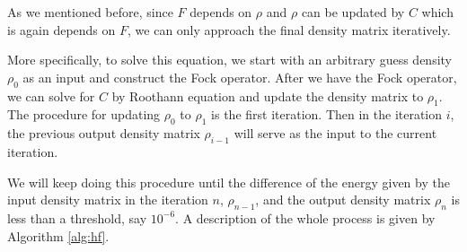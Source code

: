 \documentclass[twoside,11pt]{article}
\begin{document}



As we mentioned before, since $F$ depends on $\rho$ and $\rho$ can be updated by $C$ which is again depends on $F$, we can only approach the final density matrix iteratively.

More specifically, to solve this equation, we start with an arbitrary guess density $\rho_0$ as an input and construct the Fock operator. 
After we have the Fock operator, we can solve for $C$ by Roothann equation and update the density matrix to $\rho_1$. The procedure for updating $\rho_0$ to $\rho_1$ is the first iteration. Then in the iteration $i$, the previous output density matrix $\rho_{i-1}$ will serve as the input to the current iteration.

We will keep doing this procedure until the difference of the energy given by the input density matrix in the iteration $n$, $\rho_{n-1}$,  and the output density matrix $\rho_n$ is less than a threshold, say $10^{-6}$.  A description of the whole process is given by Algorithm \ref{alg:hf}.




\end{document}
